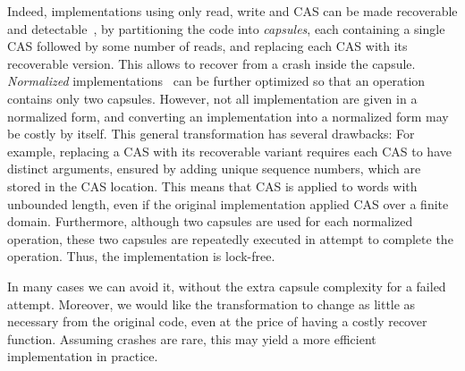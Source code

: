Indeed, implementations using only read, write and CAS can be made
recoverable and detectable~\cite{DBLP:journals/corr/abs-1806-04780},
by partitioning the code into \emph{capsules},
each containing a single CAS followed by some number of reads,
and replacing each CAS with its recoverable version.
This allows to recover from a crash inside the capsule.
\emph{Normalized} implementations~\cite{TimnatP-PPoPP2014} can be
further optimized so that an operation contains only two capsules.
However, not all implementation are given in a normalized form, and
converting an implementation into a normalized form may be costly by itself.
This general transformation has several drawbacks:
For example, replacing a CAS with its recoverable variant requires each
CAS to have distinct arguments, ensured by adding unique sequence numbers,
which are stored in the CAS location.
This means that CAS is applied to words with unbounded length,
even if the original implementation applied CAS over a finite domain.
Furthermore, although two capsules are used for each normalized operation,
these two capsules are repeatedly executed in attempt to complete the operation.
Thus, the implementation is lock-free.

In many cases we can avoid it,
without the extra capsule complexity for a failed attempt.
Moreover, we would like the transformation to change as little
as necessary from the original code,
even at the price of having a costly recover function.
Assuming crashes are rare,
this may yield a more efficient implementation in practice. 